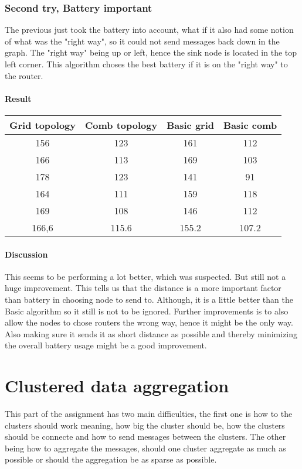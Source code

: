 \documentclass{article}
\begin{document}
\section{Second try, Battery important}
  The previous just took the battery into account, what if it also had
  some notion of what was the "right way", so it could not send messages
  back down in the graph. The "right way" being up or left, hence the sink
  node is located in the top left corner. This algorithm choses the best
  battery if it is on the "right way" to the router.
  \subsection{Result}
    \begin{tabular}{c|c||c|c}
      Grid topology & Comb topology & Basic grid & Basic comb\\
      \hline
      \hline
      156 & 123 & 161 & 112\\
      166 & 113 & 169 & 103\\
      178 & 123 & 141 & 91 \\
      164 & 111 & 159 & 118\\
      169 & 108 & 146 & 112\\
      \hline
      166,6&115.6&155.2&107.2\\
    \end{tabular}
    \subsection{Discussion}
     This seems to be performing a lot better, which was suspected. But still not a huge
     improvement. This tells us that the distance is a more important factor than battery
     in choosing node to send to. Although, it is a little better than the Basic algorithm
     so it still is not to be ignored.
     Further improvements is to also allow the nodes to chose routers the wrong way, hence 
     it might be the only way. Also making sure it sends it as short distance as possible
     and thereby minimizing the overall battery usage might be a good improvement.
     
\part{Clustered data aggregation}
  This part of the assignment has two main difficulties, the first one is 
  how to the clusters should work meaning, how big the cluster should be, how the clusters
  should be connecte and how to send messages between the clusters.
  The other being how to aggregate the messages, should one cluster aggregate as much
  as possible or should the aggregation be as sparse as possible.
\end{document}
